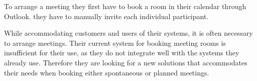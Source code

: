 


To arrange a meeting they first have to book a room in their calendar through Outlook. 
they have to manually invite each individual participant.


While accommodating customers and users of their systems, it is often necessary to arrange meetings.
Their current system for booking meeting rooms is insufficient for their use, as they do not integrate well with the systems they already use.
Therefore they are looking for a new solutions that accommodates their needs when booking either spontaneous or planned meetings. 
